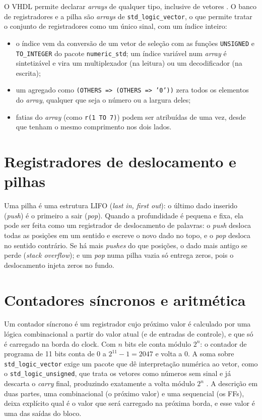 O VHDL permite declarar \textit{arrays} de qualquer tipo, inclusive de vetores \cite{aula6}. O banco de registradores e a pilha são \textit{arrays} de \texttt{std\_logic\_vector}, o que permite tratar o conjunto de registradores como um único sinal, com um índice inteiro:

\begin{itemize}
  \item o índice vem da conversão de um vetor de seleção com as funções \texttt{UNSIGNED} e \texttt{TO\_INTEGER} do pacote \texttt{numeric\_std}; um índice variável num \textit{array} é sintetizável e vira um multiplexador (na leitura) ou um decodificador (na escrita);
  \item um agregado como \texttt{(OTHERS => (OTHERS => '0'))} zera todos os elementos do \textit{array}, qualquer que seja o número ou a largura deles;
  \item fatias do \textit{array} (como \texttt{r(1 TO 7)}) podem ser atribuídas de uma vez, desde que tenham o mesmo comprimento nos dois lados.
\end{itemize}

\section{Registradores de deslocamento e pilhas}

Uma pilha é uma estrutura LIFO (\textit{last in, first out}): o último dado inserido (\textit{push}) é o primeiro a sair (\textit{pop}). Quando a profundidade é pequena e fixa, ela pode ser feita como um registrador de deslocamento de palavras: o \textit{push} desloca todas as posições em um sentido e escreve o novo dado no topo, e o \textit{pop} desloca no sentido contrário. Se há mais \textit{pushes} do que posições, o dado mais antigo se perde (\textit{stack overflow}); e um \textit{pop} numa pilha vazia só entrega zeros, pois o deslocamento injeta zeros no fundo.

\section{Contadores síncronos e aritmética}

Um contador síncrono é um registrador cujo próximo valor é calculado por uma lógica combinacional a partir do valor atual (e de entradas de controle), e que só é carregado na borda do clock. Com $n$ bits ele conta módulo $2^n$: o contador de programa de 11 bits conta de 0 a $2^{11}-1 = 2047$ e volta a 0. A soma sobre \texttt{std\_logic\_vector} exige um pacote que dê interpretação numérica ao vetor, como o \texttt{std\_logic\_unsigned}, que trata os vetores como números sem sinal e já descarta o \textit{carry} final, produzindo exatamente a volta módulo $2^n$ \cite{aula6}. A descrição em duas partes, uma combinacional (o próximo valor) e uma sequencial (os FFs), deixa explícito qual é o valor que será carregado na próxima borda, e esse valor é uma das saídas do bloco.

